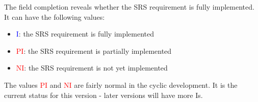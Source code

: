 \documentclass[CUx,lsstdraft,SDD]{lsstdoc}
\begin{document}
The field completion reveals whether the SRS requirement is fully implemented. It can have the following values:\\
		\begin{itemize}
			\item \textcolor{blue}{I}: the SRS requirement is fully implemented\\
			\item \textcolor{red}{PI}: the SRS requirement is partially implemented\\
			\item \textcolor{red}{NI}: the SRS requirement is not yet implemented \\
		\end{itemize}
The values \textcolor{red}{PI} and \textcolor{red}{NI} are fairly normal in the
cyclic development. It is the current status for this version - later versions will have more Is.
\end{document}
